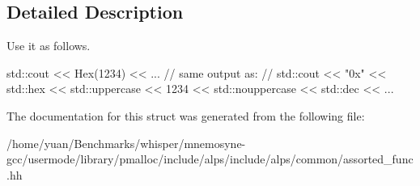 \subsection{Detailed Description}
Use it as follows. 
\begin{DoxyCode}
std::cout << Hex(1234) << ...
\textcolor{comment}{// same output as:}
\textcolor{comment}{// std::cout << "0x" << std::hex << std::uppercase << 1234 << std::nouppercase << std::dec << ...}
\end{DoxyCode}
 

The documentation for this struct was generated from the following file\+:\begin{DoxyCompactItemize}
\item 
/home/yuan/\+Benchmarks/whisper/mnemosyne-\/gcc/usermode/library/pmalloc/include/alps/include/alps/common/assorted\+\_\+func.\+hh\end{DoxyCompactItemize}
